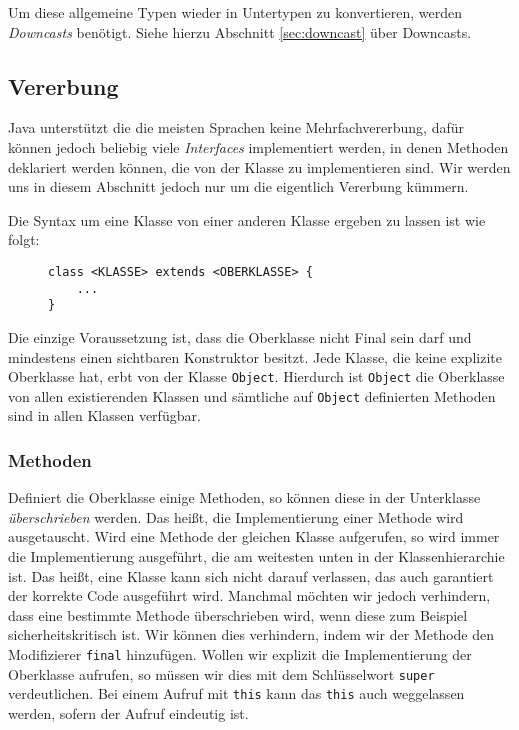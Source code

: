 		Um diese allgemeine Typen wieder in Untertypen zu konvertieren, werden \textit{Downcasts} benötigt. Siehe hierzu Abschnitt \ref{sec:downcast} über Downcasts.

\subsection{Vererbung}

	Java unterstützt die die meisten Sprachen keine Mehrfachvererbung, dafür können jedoch beliebig viele \textit{Interfaces} implementiert werden, in denen Methoden deklariert werden können, die von der Klasse zu implementieren sind. Wir werden uns in diesem Abschnitt jedoch nur um die eigentlich Vererbung kümmern.
	
	Die Syntax um eine Klasse von einer anderen Klasse ergeben zu lassen ist wie folgt:
	\begin{figure}[H]
		\centering
		\begin{lstlisting}
class <KLASSE> extends <OBERKLASSE> {
	...
}
\end{lstlisting}
	\end{figure}
	Die einzige Voraussetzung ist, dass die Oberklasse nicht Final sein darf und mindestens einen sichtbaren Konstruktor besitzt. Jede Klasse, die keine explizite Oberklasse hat, erbt von der Klasse \lstinline|Object|. Hierdurch ist \lstinline|Object| die Oberklasse von allen existierenden Klassen und sämtliche auf \lstinline|Object| definierten Methoden sind in allen Klassen verfügbar.
	
	\subsubsection{Methoden} %
		\label{sec:method_this_super}
	
		Definiert die Oberklasse einige Methoden, so können diese in der Unterklasse \textit{überschrieben} werden. Das heißt, die Implementierung einer Methode wird ausgetauscht. Wird eine Methode der gleichen Klasse aufgerufen, so wird immer die Implementierung ausgeführt, die am weitesten unten in der Klassenhierarchie ist. Das heißt, eine Klasse kann sich nicht darauf verlassen, das auch garantiert der korrekte Code ausgeführt wird. Manchmal möchten wir jedoch verhindern, dass eine bestimmte Methode überschrieben wird, wenn diese zum Beispiel sicherheitskritisch ist. Wir können dies verhindern, indem wir der Methode den Modifizierer \lstinline|final| hinzufügen. Wollen wir explizit die Implementierung der Oberklasse aufrufen, so müssen wir dies mit dem Schlüsselwort \lstinline|super| verdeutlichen. Bei einem Aufruf mit \lstinline|this| kann das \lstinline|this| auch weggelassen werden, sofern der Aufruf eindeutig ist.
		
